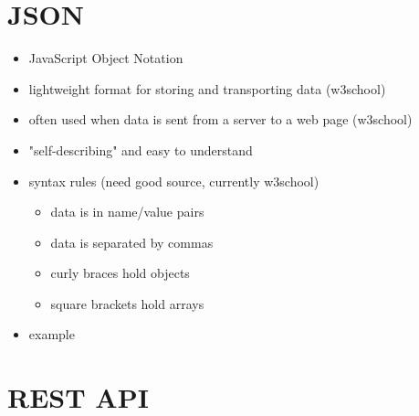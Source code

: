 \section{JSON}

\begin{itemize}
	\item JavaScript Object Notation
	\item lightweight format for storing and transporting data (w3school)
	\item often used when data is sent from a server to a web page (w3school)
	\item "self-describing" and easy to understand
	\item syntax rules (need good source, currently w3school)
	\begin{itemize}
		\item data is in name/value pairs
		\item data is separated by commas
		\item curly braces hold objects
		\item square brackets hold arrays
	\end{itemize}
	\item example
\end{itemize}


\section{REST API}
